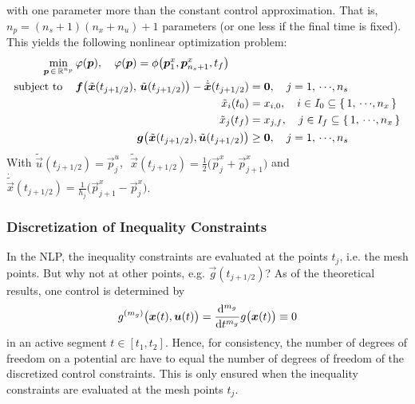 				with one parameter more than the constant control approximation. That is, \( n_p = (n_s + 1) (n_x + n_u) + 1 \) parameters (or one less if the final time is fixed). This yields the following nonlinear optimization problem:
				\begin{align*}
					\min_{\bm{p} \,\in\, \mathbb{R}^{n_p}} &\, \varphi(\bm{p}),\quad \varphi(\bm{p}) = \phi\big(\bm{p}_1^x, \bm{p}_{n_s + 1}^x, t_f\big) \\
					\mathrm{subject~to}\quad &\,
						\begin{alignedat}[t]{2}
							\bm{f}\big( \tilde{\bm{x}}(t_{j + 1/2}),\, \tilde{\bm{u}}(t_{j + 1/2}) \big) - \dot{\tilde{\bm{x}}}(t_{j + 1/2}) &= \bm{0},\quad j = 1,\,\cdots\!,n_s \\
							\tilde{x}_i(t_0) &= x_{i, 0},\quad i \in I_0 \subseteq \{\, 1,\,\cdots\!,n_x \,\} \\
							\tilde{x}_j(t_f) &= x_{j, f},\quad j \in I_f \subseteq \{\, 1,\,\cdots\!,n_x \,\} \\
							\bm{g}\big( \tilde{\bm{x}}(t_{j + 1/2}), \tilde{\bm{u}}(t_{j + 1/2}) \big) &\geq \bm{0},\quad j = 1,\,\cdots\!,n_s
						\end{alignedat}
				\end{align*}
				With \( \tilde{\vec{u}}(t_{j + 1/2}) = \vec{p}_j^u \),\,\, \( \tilde{\vec{x}}(t_{j + 1/2}) = \frac{1}{2} \big( \vec{p}_j^x + \vec{p}_{j + 1}^x \big) \) and \( \dot{\tilde{\vec{x}}}(t_{j + 1/2}) = \frac{1}{h_j} \big( \vec{p}_{j + 1}^x - \vec{p}_j^x \big) \).

			\subsubsection{Discretization of Inequality Constraints}
				In the NLP, the inequality constraints are evaluated at the points \( t_j \), i.e. the mesh points. But why not at other points, e.g. \( \vec{g}(t_{j + 1/2}) \)? As of the theoretical results, one control is determined by
				\begin{align*}
					g^{(m_g)}\big(\bm{x}(t), \bm{u}(t)\big) = \dv[m_g]{t} g\big(\bm{x}(t)\big) \equiv 0
				\end{align*}
				in an active segment \( t \in [t_1, t_2] \). Hence, for consistency, the number of degrees of freedom on a potential arc have to equal the number of degrees of freedom of the discretized control constraints. This is only ensured when the inequality constraints are evaluated at the mesh points \(t_j\).

